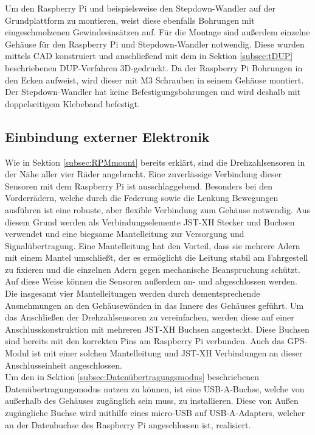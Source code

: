 Um den Raspberry Pi und beispielsweise den Stepdown-Wandler auf der Grundplattform zu montieren, weist diese ebenfalls Bohrungen mit eingeschmolzenen Gewindeeinsätzen auf. Für die Montage sind außerdem einzelne Gehäuse für den Raspberry Pi und Stepdown-Wandler notwendig. Diese wurden mittels \ac{CAD} konstruiert und anschließend mit dem in Sektion \ref{subsec:tDUP} beschriebenen \ac{DUP}-Verfahren 3D-gedruckt. Da der Raspberry Pi Bohrungen in den Ecken aufweist, wird dieser mit M3 Schrauben in seinem Gehäuse montiert. Der Stepdown-Wandler hat keine Befestigungsbohrungen und wird deshalb mit doppelseitigem Klebeband befestigt. 

\subsection{Einbindung externer Elektronik}
\label{subsec:elekExtern}
Wie in Sektion \ref{subsec:RPMmount} bereits erklärt, sind die Drehzahlsensoren in der Nähe aller vier Räder angebracht. Eine zuverlässige Verbindung dieser Sensoren mit dem Raspberry Pi ist ausschlaggebend. Besonders bei den Vorderrädern, welche durch die Federung sowie die Lenkung Bewegungen ausführen ist eine robuste, aber flexible Verbindung zum Gehäuse notwendig. Aus diesem Grund werden als Verbindungselemente JST-XH Stecker und Buchsen verwendet und eine biegsame Mantelleitung zur Versorgung und Signalübertragung. Eine Mantelleitung hat den Vorteil, dass sie mehrere Adern mit einem Mantel umschließt, der es ermöglicht die Leitung stabil am Fahrgestell zu fixieren und die einzelnen Adern gegen mechanische Beanspruchung schützt. Auf diese Weise können die Sensoren außerdem an- und abgeschlossen werden.\\
Die insgesamt vier Mantelleitungen werden durch dementsprechende Ausnehmungen an den Gehäusewänden in das Innere des Gehäuses geführt. Um das Anschließen der Drehzahlsensoren zu vereinfachen, werden diese auf einer Anschlusskonstruktion mit mehreren JST-XH Buchsen angesteckt. Diese Buchsen sind bereits mit den korrekten Pins am Raspberry Pi verbunden. Auch das \ac{GPS}-Modul ist mit einer solchen Mantelleitung und JST-XH Verbindungen an dieser Anschlusseinheit angeschlossen.\\
Um den in Sektion \ref{subsec:Datenübertragungsmodus} beschriebenen Datenübertragungsmodus nutzen zu können, ist eine \ac{USB}-A-Buchse, welche von außerhalb des Gehäuses zugänglich sein muss, zu installieren. Diese von Außen zugängliche Buchse wird mithilfe eines micro-\ac{USB} auf \ac{USB}-A-Adapters, welcher an der Datenbuchse des Raspberry Pi angeschlossen ist, realisiert.